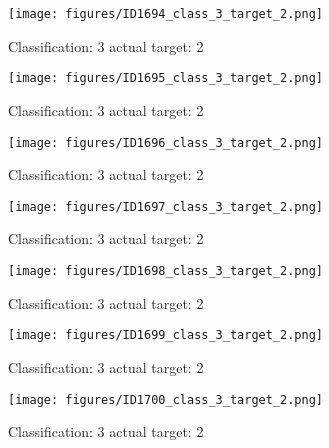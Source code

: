 \begin{figure}[h!]
\begin{center}
\texttt{[image: figures/ID1694\_class\_3\_target\_2.png]}
\end{center}
\caption{ Classification: 3 actual target: 2}
\label{fig:ID1694_class_3_target_2}
\end{figure}
\begin{figure}[h!]
\begin{center}
\texttt{[image: figures/ID1695\_class\_3\_target\_2.png]}
\end{center}
\caption{ Classification: 3 actual target: 2}
\label{fig:ID1695_class_3_target_2}
\end{figure}
\begin{figure}[h!]
\begin{center}
\texttt{[image: figures/ID1696\_class\_3\_target\_2.png]}
\end{center}
\caption{ Classification: 3 actual target: 2}
\label{fig:ID1696_class_3_target_2}
\end{figure}
\begin{figure}[h!]
\begin{center}
\texttt{[image: figures/ID1697\_class\_3\_target\_2.png]}
\end{center}
\caption{ Classification: 3 actual target: 2}
\label{fig:ID1697_class_3_target_2}
\end{figure}
\begin{figure}[h!]
\begin{center}
\texttt{[image: figures/ID1698\_class\_3\_target\_2.png]}
\end{center}
\caption{ Classification: 3 actual target: 2}
\label{fig:ID1698_class_3_target_2}
\end{figure}
\begin{figure}[h!]
\begin{center}
\texttt{[image: figures/ID1699\_class\_3\_target\_2.png]}
\end{center}
\caption{ Classification: 3 actual target: 2}
\label{fig:ID1699_class_3_target_2}
\end{figure}
\begin{figure}[h!]
\begin{center}
\texttt{[image: figures/ID1700\_class\_3\_target\_2.png]}
\end{center}
\caption{ Classification: 3 actual target: 2}
\label{fig:ID1700_class_3_target_2}
\end{figure}
